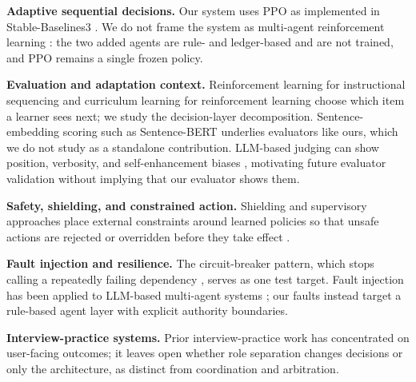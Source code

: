 \documentclass[runningheads,a4paper]{llncs}
\begin{document}
\textbf{Adaptive sequential decisions.} Our system uses PPO \cite{schulman2017} as implemented in Stable-Baselines3 \cite{raffin2021}. We do not frame the system as multi-agent reinforcement learning \cite{busoniu2008}: the two added agents are rule- and ledger-based and are not trained, and PPO remains a single frozen policy.

\textbf{Evaluation and adaptation context.} Reinforcement learning for instructional sequencing \cite{doroudi2019} and curriculum learning for reinforcement learning \cite{narvekar2020} choose which item a learner sees next; we study the decision-layer decomposition. Sentence-embedding scoring such as Sentence-BERT \cite{reimers2019} underlies evaluators like ours, which we do not study as a standalone contribution. LLM-based judging can show position, verbosity, and self-enhancement biases \cite{zheng2023}, motivating future evaluator validation without implying that our evaluator shows them.

\textbf{Safety, shielding, and constrained action.} Shielding and supervisory approaches place external constraints around learned policies so that unsafe actions are rejected or overridden before they take effect \cite{alshiekh2018,garcia2015}.

\textbf{Fault injection and resilience.} The circuit-breaker pattern, which stops calling a repeatedly failing dependency \cite{nygard2007}, serves as one test target. Fault injection has been applied to LLM-based multi-agent systems \cite{huang2025,jia2026}; our faults instead target a rule-based agent layer with explicit authority boundaries.

\textbf{Interview-practice systems.} Prior interview-practice work \cite{yazdani2025,gomez2025,vaishampayan2025} has concentrated on user-facing outcomes; it leaves open whether role separation changes decisions or only the architecture, as distinct from coordination and arbitration.
\end{document}
